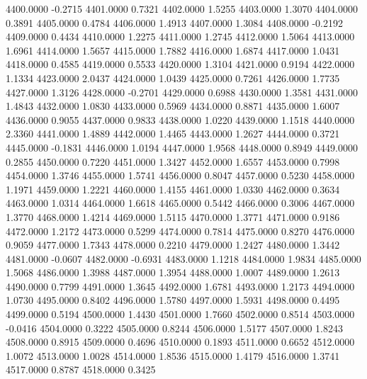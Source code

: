 4400.0000     -0.2715
4401.0000      0.7321
4402.0000      1.5255
4403.0000      1.3070
4404.0000      0.3891
4405.0000      0.4784
4406.0000      1.4913
4407.0000      1.3084
4408.0000     -0.2192
4409.0000      0.4434
4410.0000      1.2275
4411.0000      1.2745
4412.0000      1.5064
4413.0000      1.6961
4414.0000      1.5657
4415.0000      1.7882
4416.0000      1.6874
4417.0000      1.0431
4418.0000      0.4585
4419.0000      0.5533
4420.0000      1.3104
4421.0000      0.9194
4422.0000      1.1334
4423.0000      2.0437
4424.0000      1.0439
4425.0000      0.7261
4426.0000      1.7735
4427.0000      1.3126
4428.0000     -0.2701
4429.0000      0.6988
4430.0000      1.3581
4431.0000      1.4843
4432.0000      1.0830
4433.0000      0.5969
4434.0000      0.8871
4435.0000      1.6007
4436.0000      0.9055
4437.0000      0.9833
4438.0000      1.0220
4439.0000      1.1518
4440.0000      2.3360
4441.0000      1.4889
4442.0000      1.4465
4443.0000      1.2627
4444.0000      0.3721
4445.0000     -0.1831
4446.0000      1.0194
4447.0000      1.9568
4448.0000      0.8949
4449.0000      0.2855
4450.0000      0.7220
4451.0000      1.3427
4452.0000      1.6557
4453.0000      0.7998
4454.0000      1.3746
4455.0000      1.5741
4456.0000      0.8047
4457.0000      0.5230
4458.0000      1.1971
4459.0000      1.2221
4460.0000      1.4155
4461.0000      1.0330
4462.0000      0.3634
4463.0000      1.0314
4464.0000      1.6618
4465.0000      0.5442
4466.0000      0.3006
4467.0000      1.3770
4468.0000      1.4214
4469.0000      1.5115
4470.0000      1.3771
4471.0000      0.9186
4472.0000      1.2172
4473.0000      0.5299
4474.0000      0.7814
4475.0000      0.8270
4476.0000      0.9059
4477.0000      1.7343
4478.0000      0.2210
4479.0000      1.2427
4480.0000      1.3442
4481.0000     -0.0607
4482.0000     -0.6931
4483.0000      1.1218
4484.0000      1.9834
4485.0000      1.5068
4486.0000      1.3988
4487.0000      1.3954
4488.0000      1.0007
4489.0000      1.2613
4490.0000      0.7799
4491.0000      1.3645
4492.0000      1.6781
4493.0000      1.2173
4494.0000      1.0730
4495.0000      0.8402
4496.0000      1.5780
4497.0000      1.5931
4498.0000      0.4495
4499.0000      0.5194
4500.0000      1.4430
4501.0000      1.7660
4502.0000      0.8514
4503.0000     -0.0416
4504.0000      0.3222
4505.0000      0.8244
4506.0000      1.5177
4507.0000      1.8243
4508.0000      0.8915
4509.0000      0.4696
4510.0000      0.1893
4511.0000      0.6652
4512.0000      1.0072
4513.0000      1.0028
4514.0000      1.8536
4515.0000      1.4179
4516.0000      1.3741
4517.0000      0.8787
4518.0000      0.3425
